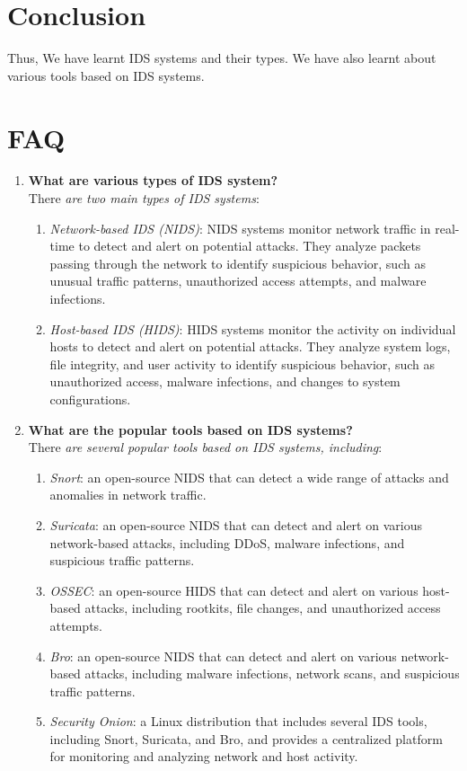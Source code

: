 \documentclass[11pt]{article}
\begin{document}
\section{Conclusion}
Thus, We have learnt IDS systems and their types. We have also learnt about various tools based on IDS systems.
\clearpage

\section{FAQ}

\begin{enumerate}
    \item \textbf{What are various types of IDS system?}\\

          There \textit{are two main types of IDS systems}:
          \begin{enumerate}
              \item \textit{Network-based IDS (NIDS)}: NIDS systems monitor network traffic in real-time to detect and alert on potential attacks. They analyze packets passing through the network to identify suspicious behavior, such as unusual traffic patterns, unauthorized access attempts, and malware infections.
              \item \textit{Host-based IDS (HIDS)}: HIDS systems monitor the activity on individual hosts to detect and alert on potential attacks. They analyze system logs, file integrity, and user activity to identify suspicious behavior, such as unauthorized access, malware infections, and changes to system configurations.
          \end{enumerate}

    \item \textbf{What are the popular tools based on IDS systems?}\\

          There \textit{are several popular tools based on IDS systems, including}:

          \begin{enumerate}
              \item \textit{Snort}: an open-source NIDS that can detect a wide range of attacks and anomalies in network traffic.
              \item \textit{Suricata}: an open-source NIDS that can detect and alert on various network-based attacks, including DDoS, malware infections, and suspicious traffic patterns.
              \item \textit{OSSEC}: an open-source HIDS that can detect and alert on various host-based attacks, including rootkits, file changes, and unauthorized access attempts.
              \item \textit{Bro}: an open-source NIDS that can detect and alert on various network-based attacks, including malware infections, network scans, and suspicious traffic patterns.
              \item \textit{Security Onion}: a Linux distribution that includes several IDS tools, including Snort, Suricata, and Bro, and provides a centralized platform for monitoring and analyzing network and host activity.
          \end{enumerate}


\end{enumerate}
\end{document}
